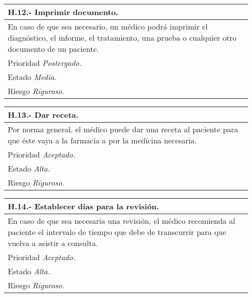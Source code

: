 	\begin{center}
	\begin{tabulary}{15cm}{|L|}
		\hline
			\bf{H.12.- Imprimir documento.} \\
		\hline
			En caso de que sea necesario, un médico podrá imprimir el diagnóstico, el informe, el tratamiento, una prueba o cualquier otro documento de un paciente. \\
		\hline
			Prioridad \textit{Postergado.} \\
		\hline
			Estado \textit{Media.} \\
		\hline
			Riesgo \textit{Riguroso.} \\
		\hline
	\end{tabulary}
	\end{center}

	\begin{center}
	\begin{tabulary}{15cm}{|L|}
		\hline
			\bf{H.13.- Dar receta.} \\
		\hline
			Por norma general, el médico puede dar una receta al paciente para que éste vaya a la farmacia a por la medicina necesaria. \\
		\hline
			Prioridad \textit{Aceptado.} \\
		\hline
			Estado \textit{Alta.} \\
		\hline
			Riesgo \textit{Riguroso.} \\
		\hline
	\end{tabulary}
	\end{center}

	\begin{center}
	\begin{tabulary}{15cm}{|L|}
		\hline
			\bf{H.14.- Establecer días para la revisión.} \\
		\hline
			En caso de que sea necesaria una revisión, el médico recomienda al paciente el intervalo de tiempo que debe de transcurrir para que vuelva a asistir a consulta. \\
		\hline
			Prioridad \textit{Aceptado.} \\
		\hline
			Estado \textit{Alta.} \\
		\hline
			Riesgo \textit{Riguroso.} \\
		\hline
	\end{tabulary}
	\end{center}

